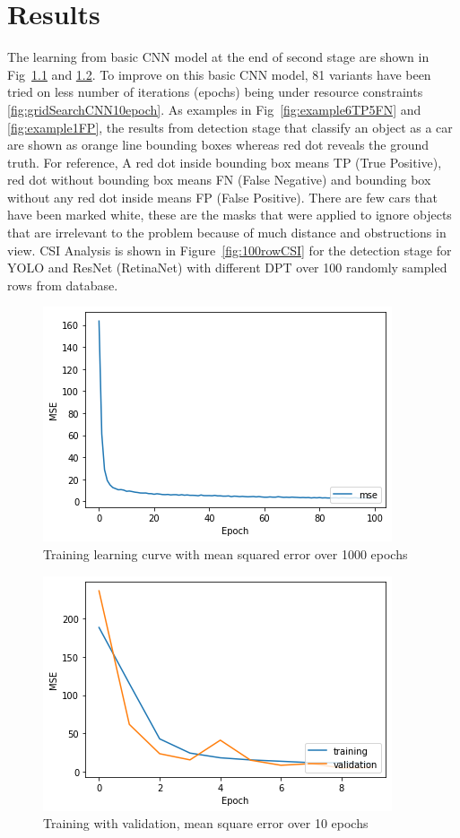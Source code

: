 \chapter{Results}
\label{chap:results}

The learning from basic CNN model at the end of second stage are shown in Fig~\ref{fig:trainCNN} and \ref{fig:trainValCNN}. To improve on this basic CNN model, 81 variants have been tried on less number of iterations (epochs) being under resource constraints \ref{fig:gridSearchCNN10epoch}. As examples in Fig~\ref{fig:example6TP5FN} and \ref{fig:example1FP}, the results from detection stage that classify an object as a car are shown as orange line bounding boxes whereas red dot reveals the ground truth. For reference, A red dot inside bounding box means TP (True Positive), red dot without bounding box means FN (False Negative) and bounding box without any red dot inside means FP (False Positive). There are few cars that have been marked white, these are the masks that were applied to ignore objects that are irrelevant to the problem because of much distance and obstructions in view. CSI Analysis is shown in Figure~\ref{fig:100rowCSI} for the detection stage for YOLO and ResNet (RetinaNet) with different DPT over 100 randomly sampled rows from database.


\begin{figure}
\centering
\includegraphics{images/train-1M-data-1000-epoch.png}
\caption{Training learning curve with mean squared error over 1000 epochs}
\label{fig:trainCNN}
\end{figure} 

\begin{figure}
\centering
\includegraphics{images/train-val-1M-data-10-epoch.png}
\caption{Training with validation, mean square error over 10 epochs}
\label{fig:trainValCNN}
\end{figure} 

